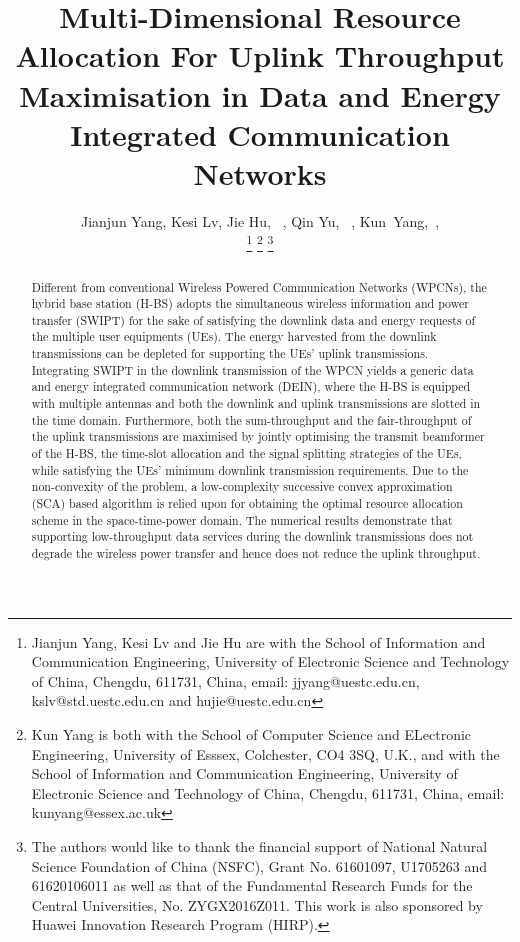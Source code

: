 \documentclass[12pt,draft,onecolumn,journal]{IEEEtran}
\begin{document}
\title{Multi-Dimensional Resource Allocation For Uplink Throughput Maximisation in Data and Energy Integrated Communication Networks}

\author{Jianjun Yang, Kesi Lv, Jie Hu, ~, Qin Yu, ~, Kun~Yang,~, 
        
\thanks{Jianjun Yang, Kesi Lv and Jie Hu are with the School of Information and Communication Engineering, University of Electronic Science and Technology of China, Chengdu, 611731, China, email: jjyang@uestc.edu.cn, kslv@std.uestc.edu.cn and hujie@uestc.edu.cn}
\thanks{Kun Yang is both with the School of Computer Science and ELectronic Engineering, University of Esssex, Colchester, CO4 3SQ, U.K., and with the School of Information and Communication Engineering, University of Electronic Science and Technology of China, Chengdu, 611731, China, email: kunyang@essex.ac.uk}
\thanks{The authors would like to thank the financial support of National Natural Science Foundation of China (NSFC), Grant No. 61601097, U1705263 and 61620106011 as well as that of the Fundamental Research Funds for the Central Universities, No. ZYGX2016Z011. This work is also sponsored by Huawei Innovation Research Program (HIRP).}}

\maketitle

\begin{abstract}
	Different from conventional Wireless Powered Communication Networks (WPCNs), the hybrid base station (H-BS) adopts the simultaneous wireless information and power transfer (SWIPT) for the sake of satisfying the downlink data and energy requests of the multiple user equipments (UEs). The energy harvested from the downlink transmissions can be depleted for supporting the UEs' uplink transmissions. Integrating SWIPT in the downlink transmission of the WPCN yields a generic data and energy integrated communication network (DEIN), where the H-BS is equipped with multiple antennas and both the downlink and uplink transmissions are slotted in the time domain. Furthermore, both the sum-throughput and the fair-throughput of the uplink transmissions are maximised by jointly optimising the transmit beamformer of the H-BS, the time-slot allocation and the signal splitting strategies of the UEs, while satisfying the UEs' minimum downlink transmission requirements. Due to the non-convexity of the problem, a low-complexity successive convex approximation (SCA) based algorithm is relied upon for obtaining the optimal resource allocation scheme in the space-time-power domain. The numerical results demonstrate that supporting low-throughput data services during the downlink transmissions does not degrade the wireless power transfer and hence does not reduce the uplink throughput.
\end{abstract}
\end{document}
